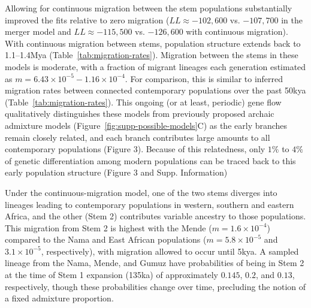 \documentclass[]{article}
\begin{document}
Allowing for continuous migration between the stem populations substantially
improved the fits relative to zero migration ($LL \approx -102,600$ vs.
$-107,700$ in the merger model and $LL \approx -115,500$ vs. $-126,600$ with
continuous migration). With continuous migration between stems, population
structure extends back to 1.1--1.4Mya (Table~\ref{tab:migration-rates}).
Migration between the stems in these models is moderate, with a fraction of
migrant lineages each generation estimated as
$m=6.43\times10^{-5}-1.16\times10^{-4}$. For comparison, this is similar
to inferred migration rates between connected contemporary populations over the
past 50kya (Table~\ref{tab:migration-rates}). This ongoing (or at least,
periodic) gene flow qualitatively distinguishes these models from previously
proposed archaic admixture models (Figure~\ref{fig:supp-possible-models}C) as
the early branches remain closely related, and each branch contributes large amounts to all contemporary populations (Figure 3). 
Because of this 
relatedness, only $1\%$ to $4\%$ of genetic differentiation among modern populations can be traced back
to this early population structure (Figure 3 and Supp. Information)
 
Under the continuous-migration model, one of the two stems diverges into
lineages leading to contemporary populations in western, southern and eastern
Africa, and the other (Stem 2) contributes variable ancestry to those
populations. This migration from Stem 2 is highest with the Mende
($m=1.6\times10^{-4}$) compared to the Nama and East African populations
($m=5.8\times10^{-5}$ and $3.1\times10^{-5}$, respectively), with migration
allowed to occur until 5kya. A
sampled lineage from the Nama, Mende, and Gumuz have probabilities of being in
Stem 2 at the time of Stem 1 expansion (135ka) of approximately $0.145$, $0.2$,
and $0.13$, respectively, though these probabilities change over time,
precluding the notion of a fixed admixture proportion.
\end{document}
